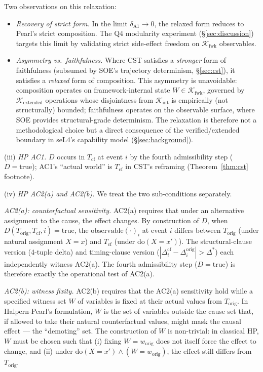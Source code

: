 \documentclass[conference]{IEEEtran}
\newcommand{\Korig}{T_\text{orig}}
\newcommand{\Tcf}{T_\text{cf}}
\newcommand{\Kextended}{\mathcal{K}_\text{extended}}
\newcommand{\Kint}{\mathcal{K}_\text{int}}
\newcommand{\Kfwk}{\mathcal{K}_\text{fwk}}
\newcommand{\Dstar}{\Delta^{*}}
\newcommand{\dox}[1]{\text{do}(X{=}#1)}
\begin{document}
Two observations on this relaxation:
\begin{itemize}[leftmargin=*]
  \item \emph{Recovery of strict form.} In the limit
    $\delta_{\text{A1}} \to 0$, the relaxed form reduces to
    Pearl's strict composition. The Q4 modularity experiment
    (\S\ref{sec:discussion}) targets this limit by validating
    strict side-effect freedom on $\Kfwk$ observables.
  \item \emph{Asymmetry vs.\ faithfulness.} Where CST satisfies a
    \emph{stronger} form of faithfulness (subsumed by SOE's
    trajectory determinism, \S\ref{sec:cst}), it satisfies a
    \emph{relaxed} form of composition. This asymmetry is
    unavoidable: composition operates on framework-internal state
    $W \in \Kfwk$, governed by $\Kextended$ operations whose
    disjointness from $\Kint$ is empirically (not structurally)
    bounded; faithfulness operates on the observable surface,
    where SOE provides structural-grade determinism. The
    relaxation is therefore not a methodological choice but a
    direct consequence of the verified/extended boundary in
    seL4's capability model (\S\ref{sec:background}).
\end{itemize}

(iii) \emph{HP AC1.} $D$ occurs in $\Tcf$ at event $i$ by the
fourth admissibility step ($D = \text{true}$); AC1's ``actual
world'' is $\Tcf$ in CST's reframing (Theorem~\ref{thm:cst}
footnote).

(iv) \emph{HP AC2(a) and AC2(b).} We treat the two sub-conditions
separately.

\emph{AC2(a): counterfactual sensitivity.} AC2(a) requires that
under an alternative assignment to the cause, the effect changes.
By construction of $D$, when $D(\Korig, \Tcf, i) = \text{true}$,
the $\text{observable}(\cdot)_i$ at event $i$ differs between
$\Korig$ (under natural assignment $X = x$) and $\Tcf$ (under
$\dox{x'}$). The structural-clause version (4-tuple delta) and
timing-clause version
($|\Delta_i^{\text{cf}} - \Delta_i^{\text{orig}}| > \Dstar$) each
independently witness AC2(a). The fourth admissibility step
($D = \text{true}$) is therefore exactly the operational test of
AC2(a).

\emph{AC2(b): witness fixity.} AC2(b) requires that the AC2(a)
sensitivity hold while a specified witness set $W$ of variables
is fixed at their actual values from $\Korig$. In Halpern-Pearl's
formulation, $W$ is the set of variables outside the cause set
that, if allowed to take their natural counterfactual values,
might mask the causal effect --- the ``demoting'' set. The
construction of $W$ is non-trivial: in classical HP, $W$ must be
chosen such that (i) fixing $W = w_{\text{orig}}$ does not itself
force the effect to change, and (ii) under
$\dox{x'} \wedge (W = w_{\text{orig}})$, the effect still differs
from $\Korig$.
\end{document}
